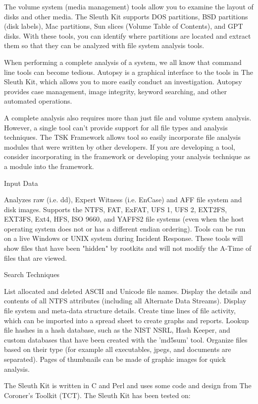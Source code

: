 The volume system (media management) tools allow you to examine the layout of disks
and other media. The Sleuth Kit supports DOS partitions, BSD partitions 
(disk labels), Mac partitions, Sun slices (Volume Table of Contents), and 
GPT disks. With these tools, you can identify where partitions are located 
and extract them so that they can be analyzed with file system analysis tools.

When performing a complete analysis of a system, we all know that command line 
tools can become tedious. Autopsy is a graphical interface to the tools in The 
Sleuth Kit, which allows you to more easily conduct an investigation. Autopsy 
provides case management, image integrity, keyword searching, and other automated
operations.

A complete analysis also requires more than just file and volume system analysis.
However, a single tool can't provide support for all file types and analysis 
techniques. The TSK Framework allows tool so easily incorporate file analysis
modules that were written by other developers. If you are developing a tool,
consider incorporating in the framework or developing your analysis technique
as a module into the framework.

Input Data

Analyzes raw (i.e. dd), Expert Witness (i.e. EnCase) and AFF file system and disk
images.
Supports the NTFS, FAT, ExFAT, UFS 1, UFS 2, EXT2FS, EXT3FS, Ext4, HFS, ISO 9660,
and YAFFS2 file systems (even when the host operating system does not or has a
different endian ordering).
Tools can be run on a live Windows or UNIX system during Incident Response. 
These tools will show files that have been "hidden" by rootkits and will not 
modify the A-Time of files that are viewed.

Search Techniques

List allocated and deleted ASCII and Unicode file names.
Display the details and contents of all NTFS attributes (including all Alternate
Data Streams).
Display file system and meta-data structure details.
Create time lines of file activity, which can be imported into a spread sheet to 
create graphs and reports.
Lookup file hashes in a hash database, such as the NIST NSRL, Hash Keeper, and 
custom databases that have been created with the 'md5sum' tool.
Organize files based on their type (for example all executables, jpegs, and
documents are separated). Pages of thumbnails can be made of graphic images 
for quick analysis.

The Sleuth Kit is written in C and Perl and uses some code and design from 
The Coroner's Toolkit (TCT). The Sleuth Kit has been tested on:

